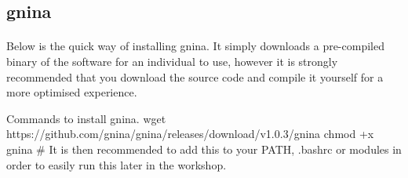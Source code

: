 \subsection{gnina} 
    \paragraph{}
    Below is the quick way of installing gnina. It simply downloads a pre-compiled binary of the software for an individual to use, however it is strongly recommended that you download the source code and compile it yourself for a more optimised experience.
    \begin{bashcmd}[label=listing:gninaINST]{Commands to install gnina.}
    wget https://github.com/gnina/gnina/releases/download/v1.0.3/gnina
    chmod +x gnina    
    # It is then recommended to add this to your PATH, .bashrc or modules in order to easily run this later in the workshop.
    \end{bashcmd}